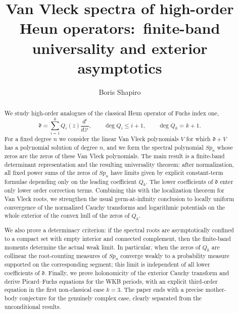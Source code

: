 \documentclass[10pt,twoside,a4paper,reqno]{amsart}
\theoremstyle{plain}
\theoremstyle{definition}
\theoremstyle{remark}
\newcommand {\dq}{\mathfrak d}
\begin{document}
\title[Van Vleck spectra of high-order Heun operators]
{Van Vleck spectra of high-order Heun operators:\ finite-band universality and exterior asymptotics}

\author{Boris Shapiro}
\address[Boris Shapiro]{
	Department of Mathematics, 
	Stockholm University,
	Kr\"{a}ftriket 5,
	SE - 106 91 Stockholm, Sweden}




\begin{abstract}
We study high-order analogues of the classical Heun operator of Fuchs index one,
\[
        \dq=\sum_{i=1}^k Q_i(z)\frac{d^i}{dz^i},
        \qquad \deg Q_i\le i+1,
        \qquad \deg Q_k=k+1.
\]
For a fixed degree $n$ we consider the linear Van Vleck polynomials $V$ for which
$\dq+V$ has a polynomial solution of degree $n$, and we form the spectral
polynomial $Sp_n$ whose zeros are the zeros of these Van Vleck polynomials.  The
main result is a finite-band determinant representation and the resulting
universality theorem: after normalization, all fixed power sums of the zeros of
$Sp_n$ have limits given by explicit constant-term formulae depending only on the
leading coefficient $Q_k$.  The lower coefficients of $\dq$ enter only lower order
correction terms.  Combining this with the localization theorem for Van Vleck
roots, we strengthen the usual germ-at-infinity conclusion to locally uniform
convergence of the normalized Cauchy transforms and logarithmic potentials on the
whole exterior of the convex hull of the zeros of $Q_k$.

We also prove a determinacy criterion: if the spectral roots are asymptotically
confined to a compact set with empty interior and connected complement, then the
finite-band moments determine the actual weak limit.  In particular, when the
zeros of $Q_k$ are collinear the root-counting measures of $Sp_n$ converge weakly
to a probability measure supported on the corresponding segment; this limit is
independent of all lower coefficients of $\dq$.  Finally, we prove holonomicity of
the exterior Cauchy transform and derive Picard--Fuchs equations for the WKB
periods, with an explicit third-order equation in the first non-classical case
$k=3$.  The paper ends with a precise mother-body conjecture for the genuinely
complex case, clearly separated from the unconditional results.
\end{abstract}
\end{document}
